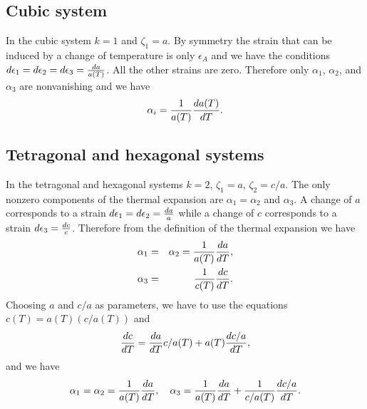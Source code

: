 \documentclass[12pt,a4paper]{article}
\begin{document}
\subsection{\color{web-blue}Cubic system}
In the cubic system $k=1$ and $\zeta_1=a$. By symmetry the strain that can
be induced by a change of temperature is only $\epsilon_A$ and we have the 
conditions ${d\epsilon_1}={d\epsilon_2}={d\epsilon_3}={da\over a(T)}$.
All the other strains are zero. Therefore only $\alpha_1$, $\alpha_2$, 
and $\alpha_3$ are nonvanishing and we have
\begin{equation}
\alpha_{i} =  {1\over a(T) } {d a(T) \over dT}.
\end{equation}

\subsection{\color{web-blue}Tetragonal and hexagonal systems}
In the tetragonal and hexagonal systems $k=2$, $\zeta_1=a$, $\zeta_2=c/a$.
The only nonzero components of the thermal expansion are 
$\alpha_{1}=\alpha_{2}$ and $\alpha_{3}$. A change of $a$ 
corresponds to a strain $d\epsilon_1=d\epsilon_2={da\over a}$ while
a change of $c$ corresponds to a strain 
$d\epsilon_3 = {dc \over c}$.
Therefore from the definition of the thermal expansion we have
\begin{eqnarray}
\alpha_1 &=& \alpha_2= {1\over a(T)} {d a \over dT}, \\ 
\alpha_3 &=& {1\over c(T)} {d c \over dT}. 
\end{eqnarray}
Choosing $a$ and $c/a$ as parameters,
we have to use the equations $c(T)=a(T) (c/a(T))$ and 
\begin{equation}
{dc \over d T} = {da \over d T} c/a(T) + a(T) {d c/a \over dT},
\end{equation}
and we have
\begin{equation}
\alpha_1 = \alpha_2= {1\over a(T)} {d a \over dT}, \ \ \ 
\alpha_3 = {1\over a(T)} {da \over d T}  + {1\over c/a(T)} {d c/a \over dT}.
\end{equation}
\end{document}
